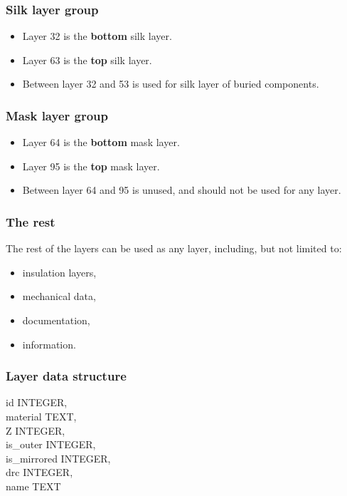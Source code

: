 \documentclass[12pt]{article}
\begin{document}
\subsubsection{Silk layer group}\label{silk-layer-group}

\begin{itemize}
\item
  Layer 32 is the \textbf{bottom} silk layer.
\item
  Layer 63 is the \textbf{top} silk layer.
\item
  Between layer 32 and 53 is used for silk layer of buried components.
\end{itemize}

\subsubsection{Mask layer group}\label{mask-layer-group}

\begin{itemize}
\itemsep1pt\parskip0pt
\item
  Layer 64 is the \textbf{bottom} mask layer.
\item
  Layer 95 is the \textbf{top} mask layer.
\item
  Between layer 64 and 95 is unused, and should not be used for any
  layer.
\end{itemize}

\subsubsection{The rest}\label{the-rest}

The rest of the layers can be used as any layer, including, but not
limited to:

\begin{itemize}
\item
  insulation layers,
\item
  mechanical data,
\item
  documentation,
\item
  information.
\end{itemize}

\subsubsection{Layer data structure}\label{layer-data-structure}

id INTEGER,\\
material TEXT,\\
Z INTEGER,\\
is\_outer INTEGER,\\
is\_mirrored INTEGER,\\
drc INTEGER,\\
name TEXT
\end{document}

